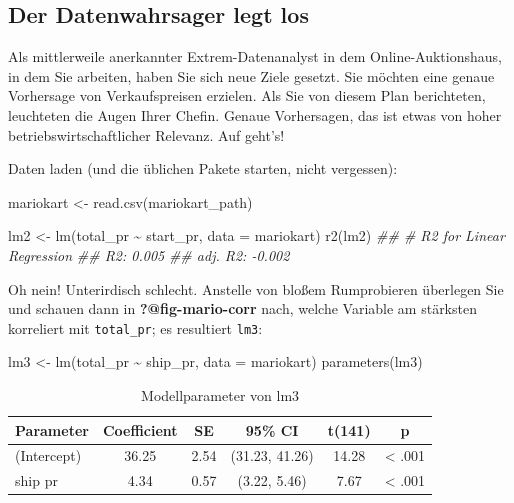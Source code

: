 \documentclass[
  letterpaper,
]{scrbook}
\newenvironment{Shaded}{\begin{snugshade}}{\end{snugshade}}
\newcommand{\AttributeTok}[1]{\textcolor[rgb]{0.40,0.45,0.13}{#1}}
\newcommand{\DocumentationTok}[1]{\textcolor[rgb]{0.37,0.37,0.37}{\textit{#1}}}
\newcommand{\FunctionTok}[1]{\textcolor[rgb]{0.28,0.35,0.67}{#1}}
\newcommand{\NormalTok}[1]{\textcolor[rgb]{0.00,0.23,0.31}{#1}}
\newcommand{\OtherTok}[1]{\textcolor[rgb]{0.00,0.23,0.31}{#1}}
\newcommand{\SpecialCharTok}[1]{\textcolor[rgb]{0.37,0.37,0.37}{#1}}
\theoremstyle{definition}
\theoremstyle{definition}
\theoremstyle{definition}
\theoremstyle{remark}
\begin{document}
\subsection{Der Datenwahrsager legt
los}\label{der-datenwahrsager-legt-los}

Als mittlerweile anerkannter Extrem-Datenanalyst in dem
Online-Auktionshaus, in dem Sie arbeiten, haben Sie sich neue Ziele
gesetzt. Sie möchten eine genaue Vorhersage von Verkaufspreisen
erzielen. Als Sie von diesem Plan berichteten, leuchteten die Augen
Ihrer Chefin. Genaue Vorhersagen, das ist etwas von hoher
betriebswirtschaftlicher Relevanz. Auf geht's!

Daten laden (und die üblichen Pakete starten, nicht vergessen):

\begin{Shaded}
\begin{Highlighting}[]
\NormalTok{mariokart }\OtherTok{\textless{}{-}} \FunctionTok{read.csv}\NormalTok{(mariokart\_path)}
\end{Highlighting}
\end{Shaded}

\begin{Shaded}
\begin{Highlighting}[]
\NormalTok{lm2 }\OtherTok{\textless{}{-}} \FunctionTok{lm}\NormalTok{(total\_pr }\SpecialCharTok{\textasciitilde{}}\NormalTok{ start\_pr, }\AttributeTok{data =}\NormalTok{ mariokart)}
\FunctionTok{r2}\NormalTok{(lm2)}
\DocumentationTok{\#\# \# R2 for Linear Regression}
\DocumentationTok{\#\#        R2: 0.005}
\DocumentationTok{\#\#   adj. R2: {-}0.002}
\end{Highlighting}
\end{Shaded}

Oh nein! Unterirdisch schlecht. Anstelle von bloßem Rumprobieren
überlegen Sie und schauen dann in \textbf{?@fig-mario-corr} nach, welche
Variable am stärksten korreliert mit \texttt{total\_pr}; es resultiert
\texttt{lm3}:

\begin{Shaded}
\begin{Highlighting}[]
\NormalTok{lm3 }\OtherTok{\textless{}{-}} \FunctionTok{lm}\NormalTok{(total\_pr }\SpecialCharTok{\textasciitilde{}}\NormalTok{ ship\_pr, }\AttributeTok{data =}\NormalTok{ mariokart)}
\FunctionTok{parameters}\NormalTok{(lm3)}
\end{Highlighting}
\end{Shaded}

\begin{longtable}[]{@{}lccccc@{}}

\caption{\label{tbl-lm3}Modellparameter von lm3}

\tabularnewline

\toprule\noalign{}
Parameter & Coefficient & SE & 95\% CI & t(141) & p \\
\midrule\noalign{}
\endhead
\bottomrule\noalign{}
\endlastfoot
(Intercept) & 36.25 & 2.54 & (31.23, 41.26) & 14.28 & \textless{}
.001 \\
ship pr & 4.34 & 0.57 & (3.22, 5.46) & 7.67 & \textless{} .001 \\

\end{longtable}
\end{document}
